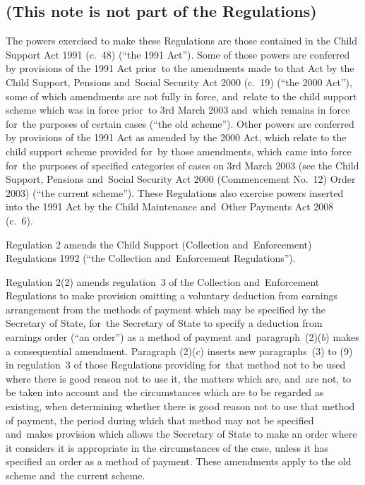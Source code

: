 \documentclass[12pt,a4paper]{article}
\begin{document}
\renewcommand\parthead{— Explanatory Note}

\subsection*{(This note is not part of the Regulations)}

The powers exercised to make these Regulations are those contained in the Child Support Act 1991 (c.~48) (“the 1991 Act”). Some of those powers are conferred by provisions of the 1991 Act prior~to the amendments made to that Act by the Child Support, Pensions and~Social Security Act 2000 (c.~19) (“the 2000 Act”), some of which amendments are not fully in force, and~relate to the child support scheme which was in force prior~to 3rd March 2003 and~which remains in force for~the purposes of certain cases (“the old scheme”). Other powers are conferred by provisions of the 1991 Act as amended by the 2000 Act, which relate to the child support scheme provided for~by those amendments, which came into force for~the purposes of specified categories of cases on 3rd March 2003 (see the Child Support, Pensions and~Social Security Act 2000 (Commencement No.~12) Order 2003) (“the current scheme”). These Regulations also exercise powers inserted into the 1991 Act by the Child Maintenance and~Other Payments Act 2008 (c.~6).

Regulation 2 amends the Child Support (Collection and~Enforcement) Regulations 1992 (“the Collection and~Enforcement Regulations”).

Regulation 2(2) amends regulation~3 of the Collection and~Enforcement Regulations to make provision omitting a voluntary deduction from earnings arrangement from the methods of payment which may be specified by the Secretary of State, for~the Secretary of State to specify a deduction from earnings order (“an order”) as a method of payment and~paragraph~(2)($b$)  makes a consequential amendment. Paragraph (2)($c$)  inserts new paragraphs~(3) to (9) in regulation~3 of those Regulations providing for~that method not to be used where there is good reason not to use it, the matters which are, and~are not, to be taken into account and~the circumstances which are to be regarded as existing, when determining whether there is good reason not to use that method of payment, the period during which that method may not be specified and~makes provision which allows the Secretary of State to make an order where it considers it is appropriate in the circumstances of the case, unless it has specified an order as a method of payment. These amendments apply to the old scheme and~the current scheme.
\end{document}
